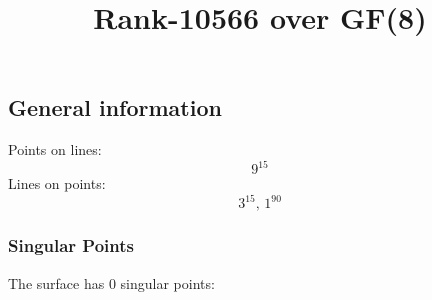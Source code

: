 \documentclass{article}
\newcommand\setTBstruts{\def\T{\rule{0pt}{2.6ex}}%
\def\B{\rule[-1.2ex]{0pt}{0pt}}}
\begin{document}
 
\setTBstruts



{\allowdisplaybreaks%






\title{Rank-10566 over GF(8)}
\author{}%
\maketitle%
%
{}



\subsection*{General information}
Points on lines:
$$
9^{15}$$
Lines on points:
$$
3^{15},\,1^{90}$$
\subsubsection*{Singular Points}
The surface has 0 singular points:\\
\begin{align*}
\end{align*}
}
\end{document}
